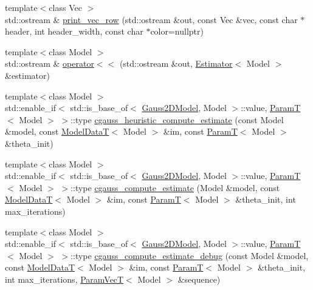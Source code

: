 \begin{DoxyCompactItemize}
\item 
{\footnotesize template$<$class Vec $>$ }\\std\+::ostream \& \hyperlink{namespacemappel_adb38bc84f5b9500d9019091e80e7ada8}{print\+\_\+vec\+\_\+row} (std\+::ostream \&out, const Vec \&vec, const char $\ast$header, int header\+\_\+width, const char $\ast$color=nullptr)
\item 
{\footnotesize template$<$class Model $>$ }\\std\+::ostream \& \hyperlink{namespacemappel_a4d47cff4f8160c609b643f7a0b021ddd}{operator$<$$<$} (std\+::ostream \&out, \hyperlink{classmappel_1_1Estimator}{Estimator}$<$ Model $>$ \&estimator)
\item 
{\footnotesize template$<$class Model $>$ }\\std\+::enable\+\_\+if$<$ std\+::is\+\_\+base\+\_\+of$<$ \hyperlink{classmappel_1_1Gauss2DModel}{Gauss2\+D\+Model}, Model $>$\+::value, \hyperlink{namespacemappel_a667925cb0d6c0e49f2f035cc5a9a6857}{ParamT}$<$ Model $>$ $>$\+::type \hyperlink{namespacemappel_a4f99d21dc5c7c014dfafa98883ce287b}{cgauss\+\_\+heuristic\+\_\+compute\+\_\+estimate} (const Model \&model, const \hyperlink{namespacemappel_a97f050df953605381ae9c901c3b125f1}{Model\+DataT}$<$ Model $>$ \&im, const \hyperlink{namespacemappel_a667925cb0d6c0e49f2f035cc5a9a6857}{ParamT}$<$ Model $>$ \&theta\+\_\+init)
\item 
{\footnotesize template$<$class Model $>$ }\\std\+::enable\+\_\+if$<$ std\+::is\+\_\+base\+\_\+of$<$ \hyperlink{classmappel_1_1Gauss2DModel}{Gauss2\+D\+Model}, Model $>$\+::value, \hyperlink{namespacemappel_a667925cb0d6c0e49f2f035cc5a9a6857}{ParamT}$<$ Model $>$ $>$\+::type \hyperlink{namespacemappel_a8e0442f3b44f3db95d6e656376f20a4c}{cgauss\+\_\+compute\+\_\+estimate} (Model \&model, const \hyperlink{namespacemappel_a97f050df953605381ae9c901c3b125f1}{Model\+DataT}$<$ Model $>$ \&im, const \hyperlink{namespacemappel_a667925cb0d6c0e49f2f035cc5a9a6857}{ParamT}$<$ Model $>$ \&theta\+\_\+init, int max\+\_\+iterations)
\item 
{\footnotesize template$<$class Model $>$ }\\std\+::enable\+\_\+if$<$ std\+::is\+\_\+base\+\_\+of$<$ \hyperlink{classmappel_1_1Gauss2DModel}{Gauss2\+D\+Model}, Model $>$\+::value, \hyperlink{namespacemappel_a667925cb0d6c0e49f2f035cc5a9a6857}{ParamT}$<$ Model $>$ $>$\+::type \hyperlink{namespacemappel_a73c162e4b173ebab8e40ab47f86a72ae}{cgauss\+\_\+compute\+\_\+estimate\+\_\+debug} (const Model \&model, const \hyperlink{namespacemappel_a97f050df953605381ae9c901c3b125f1}{Model\+DataT}$<$ Model $>$ \&im, const \hyperlink{namespacemappel_a667925cb0d6c0e49f2f035cc5a9a6857}{ParamT}$<$ Model $>$ \&theta\+\_\+init, int max\+\_\+iterations, \hyperlink{namespacemappel_a0f86d3153e4e27b095012f140eea58de}{Param\+VecT}$<$ Model $>$ \&sequence)

\end{DoxyCompactItemize}
